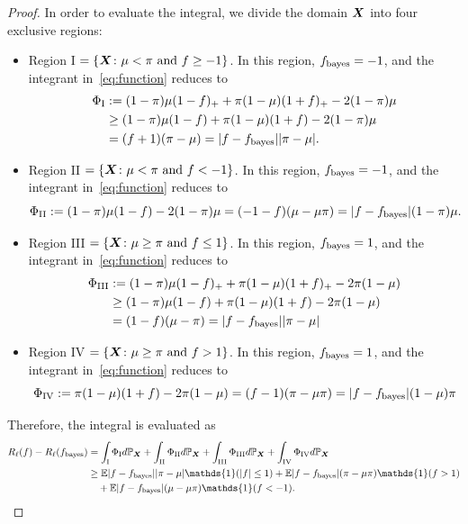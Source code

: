 \documentclass[11pt]{article}
\theoremstyle{plain}
\theoremstyle{definition}
\def\bayesf{f_{\textup{bayes}}}
\begin{document}
\begin{proof}
In order to evaluate the integral, we divide the domain $\bm X$ into four exclusive regions:
\begin{itemize}
\item Region I $= \{\bm X\colon \mu<\pi \text{ and }f\geq -1\}$. In this region, $\bayesf=-1$, and the integrant in~\eqref{eq:function} reduces to
\begin{align}
\Phi_{\textup{I}}&:=(1-\pi)\mu(1-f)_{+}+\pi(1-\mu)(1+f)_{+}-2(1-\pi)\mu\\
&\geq (1-\pi)\mu(1-f)+\pi(1-\mu)(1+f)-2(1-\pi)\mu\\
&=(f+1)(\pi-\mu)=|f-\bayesf||\pi-\mu|.
\end{align}
\item Region II $= \{\bm X\colon \mu< \pi \text{ and }f<-1\}$. In this region, $\bayesf=-1$, and the integrant in~\eqref{eq:function} reduces to
\[
\Phi_{\textup{II}}:=(1-\pi)\mu(1-f)-2(1-\pi)\mu=(-1-f)(\mu-\mu\pi )=|f-\bayesf|(1-\pi)\mu.
\]
\item Region III $=\{ \bm X\colon \mu\geq \pi \text{ and }f\leq 1\}$. In this region, $\bayesf=1$, and the integrant in~\eqref{eq:function} reduces to
\begin{align}
\Phi_{\textup{III}}&:=(1-\pi)\mu(1-f)_{+}+\pi(1-\mu)(1+f)_{+}-2\pi(1-\mu)\\
&\geq (1-\pi)\mu(1-f)+\pi(1-\mu)(1+f)-2\pi(1-\mu)\\
&=(1-f)(\mu-\pi)=|f-\bayesf||\pi-\mu|
\end{align}
\item Region IV $=\{\bm X\colon \mu\geq \pi \text{ and }f> 1\}$. In this region, $\bayesf=1$, and the integrant in~\eqref{eq:function} reduces to
\[
\Phi_{\textup{IV}}:=\pi(1-\mu)(1+f)-2\pi(1-\mu)=(f-1)(\pi-\mu\pi)=|f-\bayesf|(1-\mu)\pi
\]
\end{itemize}
Therefore, the integral is evaluated as
\begin{align}\label{eq:integral}
R_{\ell}(f)-R_{\ell}(\bayesf) &= \int_{\textup{I}}\Phi_{\textup{I}} d\mathbb{P}_{\mX}+\int_{\textup{II}}\Phi_{\textup{II}} d\mathbb{P}_{\mX}+\int_{\textup{III}}\Phi_{\textup{III}} d\mathbb{P}_{\mX}+\int_{\textup{IV}}\Phi_{\textup{IV}} d\mathbb{P}_{\mX}\\
&\geq \mathbb{E}|f-\bayesf||\pi-\mu|\mathds{1}(|f|\leq 1)+ \mathbb{E}|f-\bayesf|(\pi-\mu\pi)\mathds{1}(f>1)\\
& \quad +\mathbb{E}|f-\bayesf| (\mu-\mu\pi)\mathds{1}(f<-1).
\end{align}


\end{proof}
\end{document}

